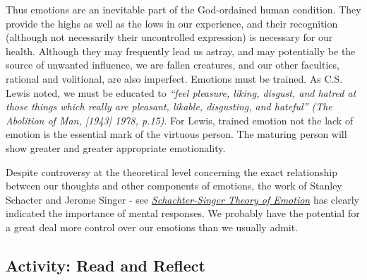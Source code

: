 \documentclass[
]{book}
\begin{document}
Thus emotions are an inevitable part of the God-ordained human condition. They provide the highs as well as the lows in our experience, and their recognition (although not necessarily their uncontrolled expression) is necessary for our health. Although they may frequently lead us astray, and may potentially be the source of unwanted influence, we are fallen creatures, and our other faculties, rational and volitional, are also imperfect. Emotions must be trained. As C.S. Lewis noted, we must be educated to \emph{``feel pleasure, liking, disgust, and hatred at those things which really are pleasant, likable, disgusting, and hateful'' (The Abolition of Man, {[}1943{]} 1978, p.15)}. For Lewis, trained emotion not the lack of emotion is the essential mark of the virtuous person. The maturing person will show greater and greater appropriate emotionality.

Despite controversy at the theoretical level concerning the exact relationship between our thoughts and other components of emotions, the work of Stanley Schacter and Jerome Singer - see \href{https://www.thoughtco.com/schachter-singer-theory-4691140}{\emph{Schachter-Singer Theory of Emotion}} has clearly indicated the importance of mental responses. We probably have the potential for a great deal more control over our emotions than we usually admit.

\hypertarget{activity-read-and-reflect-13}{%
\subsection*{Activity: Read and Reflect}\label{activity-read-and-reflect-13}}
\end{document}
